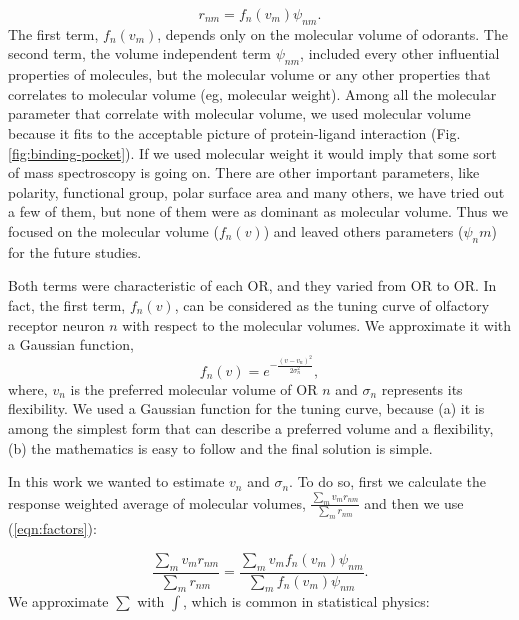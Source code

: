 \documentclass[fleqn,11pt]{wlscirep}
\begin{document}
\begin{equation}
	r_{nm} = f_n(v_m) \psi_{nm}.
	\label{eqn:factors}
\end{equation}
The first term, $f_n(v_m)$, depends only on the molecular volume of odorants.
The second term, the volume independent term $\psi_{nm}$, included every other influential properties of molecules, 
but the molecular volume or any other properties that correlates to molecular volume (eg, molecular weight).
Among all the molecular parameter that correlate with molecular volume, 
we used molecular volume because it fits to the acceptable picture of protein-ligand interaction (Fig. \ref{fig:binding-pocket}).
If we used molecular weight it would imply that some sort of mass spectroscopy is going on. 
There are other important parameters, like polarity, functional group, polar surface area and many others, 
we have tried out a few of them, but none of them were as dominant as molecular volume. 
Thus we focused on the molecular volume ($f_n(v)$) and leaved others parameters ($\psi_nm$) for the future studies.

Both terms were characteristic of each OR, and they varied from OR to OR.
In fact, the first term, $f_n(v)$, can be considered as the tuning curve of olfactory receptor neuron $n$ with respect to the molecular volumes. 
We approximate it with a Gaussian function,  
\begin{equation}
	\displaystyle f_n(v) = e^{-\frac{(v-v_n)^2}{2\sigma^2_n}}, 
	\label{eqn:volume-dependence}
\end{equation}
where, $v_n$ is the preferred molecular volume of OR $n$ and $\sigma_n$ represents its flexibility. 
We used a Gaussian function for the tuning curve, because (a) it is among the simplest form that can describe a preferred  volume and a flexibility, 
(b) the mathematics is easy to follow and the final solution is simple.

In this work we wanted to estimate $v_n$ and $\sigma_n$. 
To do so, first we calculate the response weighted average of molecular volumes, 
$\frac{\sum_{m} v_m r_{nm}}{\sum_{m} r_{nm}}$ and then we use (\ref{eqn:factors}):

\begin{equation}
	\frac{\displaystyle \sum_{m} v_m r_{nm}}{\displaystyle \sum_{m} r_{nm}} = \frac{\displaystyle \sum_{m} v_m f_n(v_m) \psi_{nm}}{\displaystyle \sum_{m} f_n(v_m) \psi_{nm}}.
	\label{eqn:sta}
\end{equation}
We approximate $\sum$ with $\int$, which is common in statistical physics:
\end{document}
